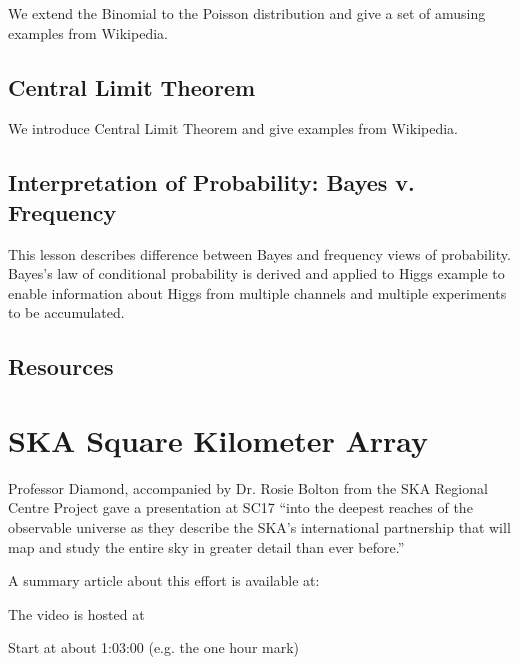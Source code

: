 We extend the Binomial to the Poisson distribution and give a set of
amusing examples from Wikipedia.


\subsection{Central Limit Theorem}\label{central-limit-theorem}

We introduce Central Limit Theorem and give examples from Wikipedia.


\subsection{Interpretation of Probability: Bayes v.
Frequency}\label{interpretation-of-probability-bayes-v.-frequency}

This lesson describes difference between Bayes and frequency views of
probability. Bayes's law of conditional probability is derived and
applied to Higgs example to enable information about Higgs from multiple
channels and multiple experiments to be accumulated.


\subsection{Resources}\label{resources-3}


\section{SKA Square Kilometer Array}


Professor Diamond, accompanied by Dr. Rosie Bolton from the SKA
Regional Centre Project gave a presentation at SC17 ``into the deepest
reaches of the observable universe as they describe the SKA’s
international partnership that will map and study the entire sky in
greater detail than ever before.''


A summary article about this effort is available at:


The video is hosted at 


Start at about 1:03:00 (e.g. the one hour mark)